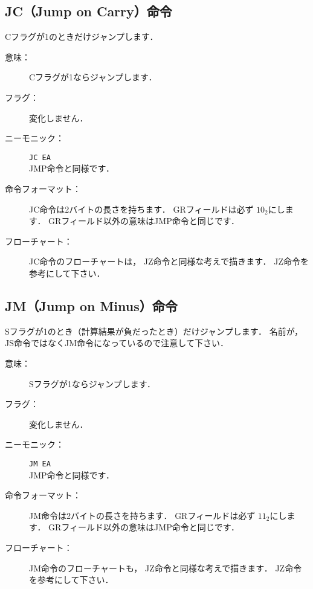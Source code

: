 \newpage
\subsection{JC（Jump on Carry）命令}
Cフラグが1のときだけジャンプします．

\begin{description}
\item[意味：]Cフラグが1ならジャンプします．
\item[フラグ：]変化しません．
\item[ニーモニック：]{\tt JC  EA} \\
JMP命令と同様です．
\item[命令フォーマット：]JC命令は2バイトの長さを持ちます．
GRフィールドは必ず $10_2$にします．
GRフィールド以外の意味はJMP命令と同じです．


\item[フローチャート：]JC命令のフローチャートは，
JZ命令と同様な考えで描きます．
JZ命令を参考にして下さい．

\end{description}

\subsection{JM（Jump on Minus）命令}
Sフラグが1のとき（計算結果が負だったとき）だけジャンプします．
名前が，JS命令ではなくJM命令になっているので注意して下さい．

\begin{description}
\item[意味：]Sフラグが1ならジャンプします．

\item[フラグ：]変化しません．

\item[ニーモニック：]{\tt JM  EA} \\
JMP命令と同様です．

\item[命令フォーマット：]JM命令は2バイトの長さを持ちます．
GRフィールドは必ず $11_2$にします．
GRフィールド以外の意味はJMP命令と同じです．


\item[フローチャート：]JM命令のフローチャートも，
JZ命令と同様な考えで描きます．
JZ命令を参考にして下さい．
\end{description}

